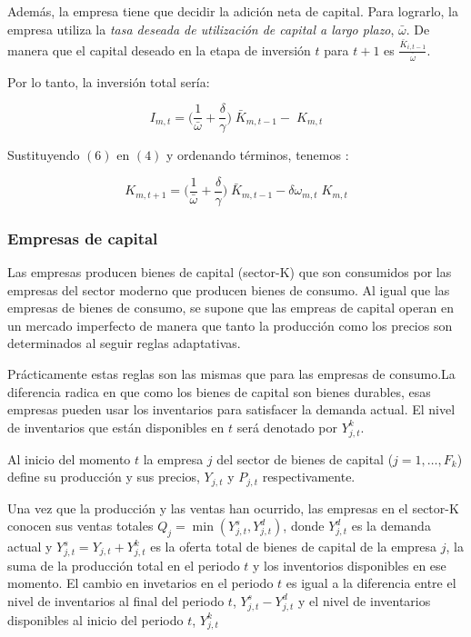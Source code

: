 \documentclass[12pt,a4paper]{article}
\begin{document}
Además, la empresa tiene que decidir la adición neta de capital. Para lograrlo, la empresa utiliza la \textit{tasa deseada de utilización de capital a largo plazo}, $\bar{\omega}$. De manera que el capital deseado en la etapa de inversión $t$ para $t+1$ es $\frac{\bar{K}_{i,t-1}}{\bar{\omega}}$.

Por lo tanto, la inversión total sería:

\begin{equation}
I_{m,t}= \Big ( \dfrac{1}{\bar{\omega}} + \dfrac{\delta}{\gamma} \Big) \; \bar{K}_{m,t-1} - \;K_{m,t}
\end{equation}

Sustituyendo $(6)$ en $(4)$ y ordenando términos, tenemos :

\begin{equation}
K_{m,t+1} = \Big ( \dfrac{1}{\bar{\omega}} + \dfrac{\delta}{\gamma} \Big) \; \bar{K}_{m,t-1} - \delta \omega_{m,t}\;K_{m,t}
\end{equation}

\subsubsection{Empresas de capital}

Las empresas producen bienes de capital (sector-K) que son consumidos por las empresas del sector moderno que producen bienes de consumo. Al igual que las empresas de bienes de consumo, se supone que las empreas de capital operan en un mercado imperfecto de manera que tanto la producción como los precios son determinados al seguir reglas adaptativas.

Prácticamente estas reglas son las mismas que para las empresas de consumo.La diferencia radica en que como los bienes de capital son bienes durables, esas empresas pueden usar los inventarios para satisfacer la demanda actual. El nivel de inventarios que están disponibles en $t$ será denotado por $Y_{j,t}^k$. 

Al inicio del momento $t$ la empresa $j$ del sector de bienes de capital ($j =1, \hdots,F_k$) define su producción y sus precios, $Y_{j,t}$ y $P_{j,t}$ respectivamente. 

Una vez que la producción y las ventas han ocurrido, las empresas en el sector-K conocen sus ventas totales $Q_{j}= \min (Y_{j,t}^s,Y_{j,t}^d)$, donde $Y_{j,t}^d$ es la demanda actual y $Y_{j,t}^s= Y_{j,t} +Y_{j,t}^k$ es la oferta total de bienes de capital de la empresa $j$, la suma de la producción total en el periodo $t$ y los inventorios disponibles en ese momento. El cambio en invetarios en el periodo $t$ es igual a la diferencia entre el nivel de inventarios al final del periodo $t$, $Y_{j,t}^s - Y_{j,t}^d$ y el nivel de inventarios disponibles al inicio del periodo $t$, $Y_{j,t}^k$
\end{document}
